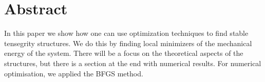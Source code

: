 \section{Abstract}
In this paper we show how one can use optimization techniques to find stable tensegrity structures. We do this by finding local minimizers of the mechanical energy of the system. There will be a focus on the theoretical aspects of the structures, but there is a section at the end with numerical results. For numerical optimisation, we applied the BFGS method. 